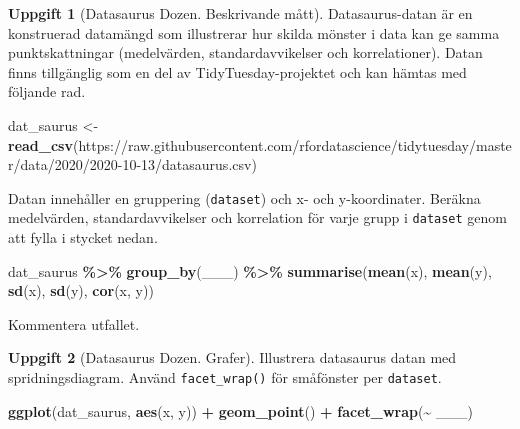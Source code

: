 \documentclass[
]{book}
\newenvironment{Shaded}{\begin{snugshade}}{\end{snugshade}}
\newcommand{\FunctionTok}[1]{\textcolor[rgb]{0.13,0.29,0.53}{\textbf{#1}}}
\newcommand{\NormalTok}[1]{#1}
\newcommand{\OtherTok}[1]{\textcolor[rgb]{0.56,0.35,0.01}{#1}}
\newcommand{\SpecialCharTok}[1]{\textcolor[rgb]{0.81,0.36,0.00}{\textbf{#1}}}
\newcommand{\StringTok}[1]{\textcolor[rgb]{0.31,0.60,0.02}{#1}}
\theoremstyle{definition}
\theoremstyle{definition}
\theoremstyle{definition}
\newtheorem{exercise}{Uppgift}[chapter]
\theoremstyle{definition}
\theoremstyle{remark}
\begin{document}
\begin{exercise}[Datasaurus Dozen. Beskrivande mått]
Datasaurus-datan är en konstruerad datamängd som illustrerar hur skilda mönster i data kan ge samma punktskattningar (medelvärden, standardavvikelser och korrelationer). Datan finns tillgänglig som en del av TidyTuesday-projektet och kan hämtas med följande rad.

\begin{Shaded}
\begin{Highlighting}[]
\NormalTok{dat\_saurus }\OtherTok{\textless{}{-}} \FunctionTok{read\_csv}\NormalTok{(}\StringTok{\textquotesingle{}https://raw.githubusercontent.com/rfordatascience/tidytuesday/master/data/2020/2020{-}10{-}13/datasaurus.csv\textquotesingle{}}\NormalTok{)}
\end{Highlighting}
\end{Shaded}

Datan innehåller en gruppering (\texttt{dataset}) och x- och y-koordinater. Beräkna medelvärden, standardavvikelser och korrelation för varje grupp i \texttt{dataset} genom att fylla i stycket nedan.

\begin{Shaded}
\begin{Highlighting}[]
\NormalTok{dat\_saurus }\SpecialCharTok{\%\textgreater{}\%} 
  \FunctionTok{group\_by}\NormalTok{(\_\_\_) }\SpecialCharTok{\%\textgreater{}\%} 
  \FunctionTok{summarise}\NormalTok{(}\FunctionTok{mean}\NormalTok{(x), }\FunctionTok{mean}\NormalTok{(y), }\FunctionTok{sd}\NormalTok{(x), }\FunctionTok{sd}\NormalTok{(y), }\FunctionTok{cor}\NormalTok{(x, y))}
\end{Highlighting}
\end{Shaded}

Kommentera utfallet.
\end{exercise}

\begin{exercise}[Datasaurus Dozen. Grafer]

Illustrera datasaurus datan med spridningsdiagram. Använd \texttt{facet\_wrap()} för småfönster per \texttt{dataset}.

\begin{Shaded}
\begin{Highlighting}[]
\FunctionTok{ggplot}\NormalTok{(dat\_saurus, }\FunctionTok{aes}\NormalTok{(x, y)) }\SpecialCharTok{+}
  \FunctionTok{geom\_point}\NormalTok{() }\SpecialCharTok{+}
  \FunctionTok{facet\_wrap}\NormalTok{(}\SpecialCharTok{\textasciitilde{}}\NormalTok{ \_\_\_)}
\end{Highlighting}
\end{Shaded}

\end{exercise}
\end{document}

